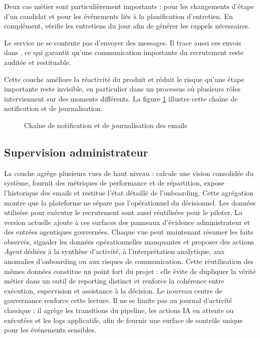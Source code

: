Deux cas métier sont particulièrement importants :  pour les changements d'étape d'un candidat et  pour les événements liés à la planification d'entretien. En complément,  vérifie les entretiens du jour afin de générer les rappels nécessaires.

Le service  ne se contente pas d'envoyer des messages. Il trace aussi ces envois dans , ce qui garantit qu'une communication importante du recrutement reste auditée et restituable.

Cette couche améliore la réactivité du produit et réduit le risque qu'une étape importante reste invisible, en particulier dans un processus où plusieurs rôles interviennent sur des moments différents. La figure \ref{fig:notification-email-sequence} illustre cette chaîne de notification et de journalisation.

\begin{figure}[H]
  \centering
  \caption{\label{fig:notification-email-sequence}Chaîne de notification et de journalisation des emails}
\end{figure}

\subsection{Supervision administrateur}
La couche  agrège plusieurs vues de haut niveau :  calcule une vision consolidée du système,  fournit des métriques de performance et de répartition,  expose l'historique des emails et  restitue l'état détaillé de l'onboarding.
Cette agrégation montre que la plateforme ne sépare pas l'opérationnel du décisionnel. Les données utilisées pour exécuter le recrutement sont aussi réutilisées pour le piloter.
La version actuelle ajoute à ces surfaces des panneaux d'évidence administrateur et des entrées agentiques gouvernées. Chaque vue peut maintenant résumer les faits observés, signaler les données opérationnelles manquantes et proposer des actions \textit{Agent} dédiées à la synthèse d'activité, à l'interprétation analytique, aux anomalies d'onboarding ou aux risques de communication.
Cette réutilisation des mêmes données constitue un point fort du projet : elle évite de dupliquer la vérité métier dans un outil de reporting distinct et renforce la cohérence entre exécution, supervision et assistance à la décision.
Le nouveau centre de gouvernance renforce cette lecture. Il ne se limite pas au journal d'activité classique : il agrège les transitions du pipeline, les actions IA en attente ou exécutées et les logs applicatifs, afin de fournir une surface de contrôle unique pour les événements sensibles.
